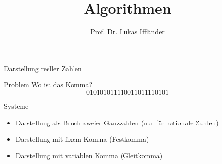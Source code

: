 \documentclass[xelatex,aspectratio=169]{beamer}
\title{Algorithmen}
\author{Prof. Dr. Lukas Iffländer}
\institute{HTW Dresden}
\date{}
\begin{document}
\begin{frame}{Darstellung reeller Zahlen}
  \begin{alertblock}{Problem}
    \centering
    Wo ist das Komma?
    \[ 010101011110011011110101 \]
  \end{alertblock}
  \begin{block}{Systeme}
    \begin{itemize}
      \item Darstellung als Bruch zweier Ganzzahlen (nur für rationale Zahlen)
      \item Darstellung mit fixem Komma (Festkomma)
      \item Darstellung mit variablen Komma (Gleitkomma)
    \end{itemize}
  \end{block}

\end{frame}
\end{document}

